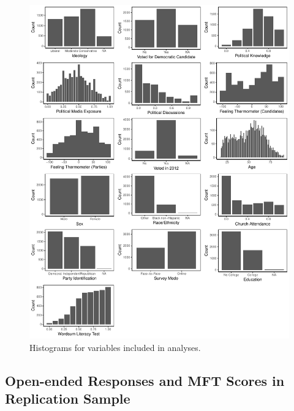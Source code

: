 \documentclass[12pt]{article}
\begin{document}
\begin{figure}[h]\centering
\includegraphics[width=\textwidth]{../calc/fig/app_desc.pdf}
\caption{Histograms for variables included in analyses.}\label{fig:app_desc}
\end{figure}


\clearpage
\subsection{Open-ended Responses and MFT Scores in Replication Sample}
\end{document}
